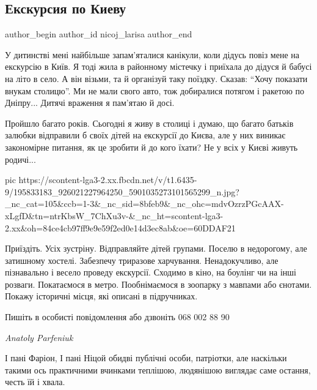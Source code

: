  
 
 
 
 
 
\subsection{Екскурсия по Киеву}
\label{sec:01_06_2021.fb.nicoj_larisa.1.ekskursia_kiev}
\ifcmt
 author_begin
   author_id nicoj_larisa
 author_end
\fi

У дитинстві мені найбільше запам'яталися канікули, коли дідусь повіз мене на
екскурсію в Київ. Я тоді жила в районному містечку і приїхала до дідуся й
бабусі на літо в село. А він візьми, та й організуй таку поїздку. Сказав:
\enquote{Хочу показати внукам столицю}. Ми не мали свого авто, тож добиралися
потягом і ракетою по Дніпру... Дитячі враження я пам'ятаю й досі. 

Пройшло багато років. Сьогодні я живу в столиці і думаю, що багато батьків
залюбки відправили б своїх дітей на екскурсії до Києва, але у них виникає
закономірне питання, як це зробити й до кого їхати? Не у всіх у Києві живуть
родичі...

\ifcmt
  pic https://scontent-lga3-2.xx.fbcdn.net/v/t1.6435-9/195833183_926021227964250_5901035273101565299_n.jpg?_nc_cat=105&ccb=1-3&_nc_sid=8bfeb9&_nc_ohc=mdvOzrzPGcAAX-xLgfD&tn=ntrKbsW_7ChXu3v-&_nc_ht=scontent-lga3-2.xx&oh=84ce4cb97ff9e9e59f2ed0e14d3ec8ab&oe=60DDAF21
\fi

Приїздіть. Усіх зустріну.  Відправляйте дітей групами. Поселю в недорогому, але
затишному хостелі. Забезпечу триразове харчування. Ненадокучливо, але
пізнавально і весело проведу екскурсії. Сходимо в кіно, на боулінг чи на інші
розваги. Покатаємося в метро. Пообнімаємося в зоопарку з мавпами або єнотами.
Покажу історичні місця, які описані в підручниках.

Пишіть в особисті повідомлення або дзвоніть 068 002 88 90

\emph{Anatoly Parfeniuk}

І пані Фаріон, І пані Ніцой обидві публічні особи, патріотки, але наскільки
такими ось практичними вчинками теплішою, людянішою виглядає саме остання,
честь їй і хвала.

